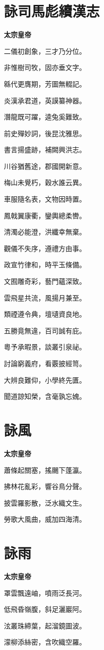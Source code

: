 \documentclass[12pt,a4paper]{ctexbook}
\begin{document}
\section{詠司馬彪續漢志}
\textbf{太宗皇帝}\par\vspace{0.5em}
二儀初創象，三才乃分位。\par
非惟樹司牧，固亦垂文字。\par
緜代更膺期，芳圖無輟記。\par
炎漢承君道，英謨纂神器。\par
潛龍既可躍，逵兔奚難致。\par
前史殫妙詞，後昆沈雅思。\par
書言揚盛跡，補闕興洪志。\par
川谷猶舊途，郡國開新意。\par
梅山未覺朽，穀水誰云異。\par
車服隨名表，文物因時置。\par
鳳戟翼康衢，鑾輿總柔轡。\par
清濁必能澄，洪纖幸無棄。\par
觀儀不失序，遵禮方由事。\par
政宣竹律和，時平玉條備。\par
文囿雕奇彩，藝門蘊深致。\par
雲飛星共流，風揚月兼至。\par
類禋遵令典，壇壝資良地。\par
五勝竟無違，百司誠有庇。\par
粵予承暇景，談叢引泉祕。\par
討論窮義府，看覈披經笥。\par
大辨良難仰，小學終先匱。\par
聞道諒知榮，含毫孰忘媿。\par

\section{詠風}
\textbf{太宗皇帝}\par\vspace{0.5em}
蕭條起關塞，搖颺下蓬瀛。\par
拂林花亂彩，響谷鳥分聲。\par
披雲羅影散，泛水織文生。\par
勞歌大風曲，威加四海清。\par

\section{詠雨}
\textbf{太宗皇帝}\par\vspace{0.5em}
罩雲飄遠岫，噴雨泛長河。\par
低飛昏嶺腹，斜足灑巖阿。\par
泫叢珠締葉，起溜鏡圖波。\par
濛柳添絲密，含吹織空羅。\par
\end{document}
